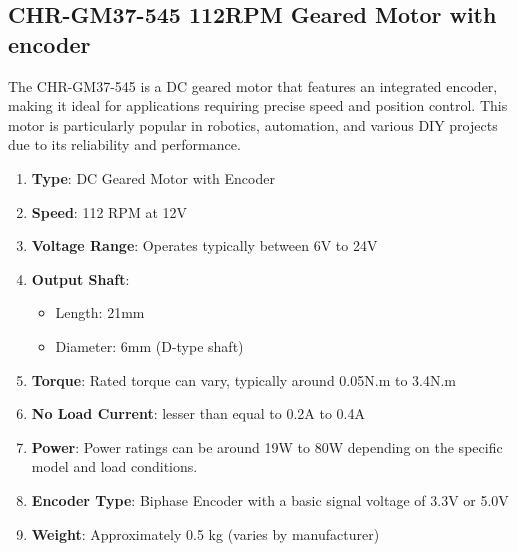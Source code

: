 \subsection{\fontsize{14}{16} CHR-GM37-545 112RPM Geared Motor with encoder}
{
	\fontsize{12}{14}
	The CHR-GM37-545 is a DC geared motor that features an integrated encoder, making it ideal for applications requiring precise speed and position control. This motor is particularly popular in robotics, automation, and various DIY projects due to its reliability and performance.
	\begin{enumerate}
		\item \textbf{Type}: DC Geared Motor with Encoder
		
		\item \textbf{Speed}: 112 RPM at 12V
		
		\item \textbf{Voltage Range}: Operates typically between 6V to 24V
		
		\item \textbf{Output Shaft}: 
		\begin{itemize}
			\item Length: 21mm
			\item Diameter: 6mm (D-type shaft)
		\end{itemize}
		
		\item \textbf{Torque}: Rated torque can vary, typically around 0.05N.m to 3.4N.m
		
		\item \textbf{No Load Current}: lesser than equal to 0.2A to 0.4A
		
		\item \textbf{Power}: Power ratings can be around 19W to 80W depending on the specific model and load conditions.
		
		\item \textbf{Encoder Type}: Biphase Encoder with a basic signal voltage of 3.3V or 5.0V
		
		\item \textbf{Weight}: Approximately 0.5 kg (varies by manufacturer)
		
	\end{enumerate}
}

